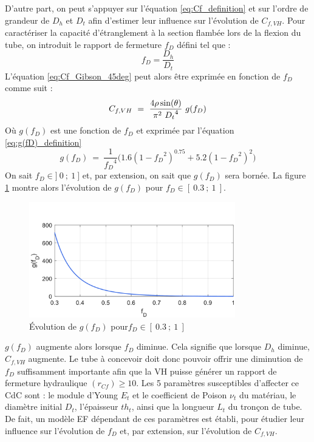 D'autre part, on peut s'appuyer sur l'équation \ref{eq:Cf_definition} et sur l'ordre de grandeur de $D_h$ et $D_t$ afin d'estimer leur influence sur l'évolution de $C_{f,VH}$. Pour caractériser la capacité d'étranglement à la section flambée lors de la flexion du tube, on introduit le rapport de fermeture $f_D$ défini tel que :
\begin{equation}
	f_D = \frac{D_h}{D_t}
	\label{eq:f_D_definition}
\end{equation}
L'équation \ref{eq:Cf_Gibson_45deg} peut alors être exprimée en fonction de $f_D$ comme suit :
\begin{equation}
C_{f,VH}\ =\ \frac{4\rho\sin(\theta)}{\pi^2\ {D_t}^4}\ g(f_D)
\label{eq:Cf_Gibson_g(fD)}\\
\end{equation}
Où $g(f_D)$ est une fonction de $f_D$  et exprimée par l'équation \ref{eq:g(fD)_definition}
\begin{equation}
g(f_D)  \ =\ \dfrac{1}{{f_D}^4} \biggl(1.6(1-{f_D}^2)^{0.75} + 5.2(1-{f_D}^2)^2\biggr)
\label{eq:g(fD)_definition}
\end{equation}
On sait $f_D\in]\ 0\ ;\ 1\ ]$ et, par extension, on sait que $g(f_D)$ sera bornée. La figure \ref{fig:g(fD)} montre alors l'évolution de $g(f_D)$ pour $f_D\in[\ 0.3\ ;\ 1\ ]$. 
\begin{figure}[!htb]
	\begin{center}
		\captionsetup{justification=centering}
		\includegraphics[trim={0cm 0cm 0cm 3cm},clip,width=0.8\textwidth]{../Chap5/Figure/g(fD).pdf}
		\caption{Évolution de $g(f_D)$ pour$f_D\in[\ 0.3\ ;\ 1\ ]$ }
		\label{fig:g(fD)}
	\end{center}
\end{figure}
$g(f_D)$ augmente alors lorsque $f_D$ diminue. Cela signifie que lorsque $D_h$ diminue, $C_{f,VH}$ augmente. Le tube à concevoir doit donc pouvoir offrir une diminution de $f_D$ suffisamment importante afin que la VH puisse générer un rapport de fermeture hydraulique $(r_{Cf}) \ge 10$.
Les 5 paramètres susceptibles d'affecter ce CdC sont : le module d'Young $E_{t}$ et le coefficient de Poison $\nu_t$ du matériau, le diamètre initial $D_t$, l'épaisseur $th_t$, ainsi que la longueur $L_t$ du tronçon de tube. De fait, un modèle EF dépendant de ces paramètres est établi, pour étudier leur influence sur l'évolution de $f_D$ et, par extension, sur l'évolution de $C_{f,VH}$.

